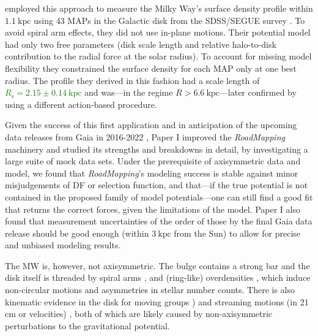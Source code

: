 \documentclass[iop,revtex4,numberedappendix,appendixfloats]{emulateapj}
\newcommand{\RM}{{\sl RoadMapping}}
\newcommand{\NEW}[1]{\textcolor{Green}{#1}}
\newcommand{\OLD}[1]{}
\begin{document}
\citet{2013ApJ...779..115B} employed this approach to measure the Milky Way's surface density profile within $1.1~\text{kpc}$ using 43 MAPs in the Galactic disk from the SDSS/SEGUE survey \citep{2009AJ....137.4377Y}. To avoid spiral arm effects, they did not use in-plane motions. Their potential model had only two free parameters (disk scale length and relative halo-to-disk contribution to the radial force at the solar radius). To account for missing model flexibility they constrained the surface density for each MAP only at one best radius. The profile they derived in this fashion had a scale length of \OLD{$R_\text{s}=2.5~\text{kpc}$}\NEW{$R_\text{s}=2.15\pm0.14~\text{kpc}$} and was---in the regime $R>6.6~\text{kpc}$---later confirmed by \citet{2014MNRAS.445.3133P} using a different action-based procedure.

Given the success of this first application and in anticipation of the upcoming data releases from Gaia in 2016-2022 \citep{2013CEAB...37..115E}, Paper I improved the \RM{} machinery and studied its strengths and breakdowns in detail, by investigating a large suite of mock data sets. Under the prerequisite of axisymmetric data and model, we found that \RM{}'s modeling success is stable against minor misjudgements of DF or selection function, and that---if the true potential is not contained in the proposed family of model potentials---one can still find a good fit that returns the correct forces, given the limitations of the model. Paper I also found that measurement uncertainties of the order of those by the final Gaia data release should be good enough (within $3~\text{kpc}$ from the Sun) to allow for precise and unbiased modeling results. 

The MW is, however, not axisymmetric. The bulge contains a strong bar \citep{1980ApJ...236..779L,1991ApJ...379..631B,1991MNRAS.252..210B,1997MNRAS.288..365B,2000MNRAS.317L..45H,2013MNRAS.435.1874W} and the disk itself is threaded by spiral arms \citep{1958MNRAS.118..379O,1976A&A....49...57G,2009PASP..121..213C,2014ApJ...783..130R}, and (ring-like) overdensities \citep{2002ApJ...569..245N,2008ApJ...673..864J,2015ApJ...801..105X}, which induce non-circular motions and asymmetries in stellar number counts. There is also kinematic evidence in the disk for moving groups \citep{1998AJ....115.2384D,2005A&A...430..165F,2009ApJ...700.1794B,2010ApJ...717..617B}) and streaming motions (in 21 cm or velocities) \citep{2015ApJ...800...83B,2013MNRAS.436..101W,2012MNRAS.425.2335S}, both of which are likely caused by non-axisymmetric perturbations to the gravitational potential.
\end{document}
